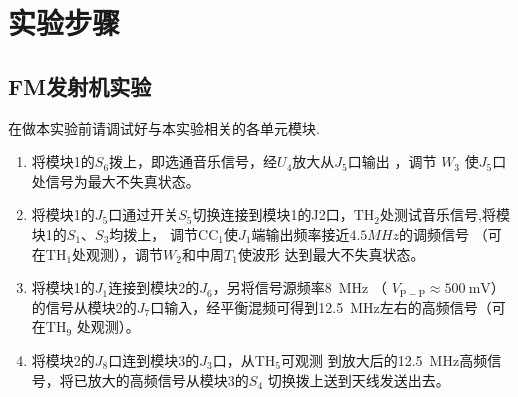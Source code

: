 \documentclass[../main]{subfiles}
\begin{document}
\section{实验步骤}%
\label{sec:\arabic{chapter}实验步骤}

\subsection{FM发射机实验}%
\label{sub:FM发射机实验}

在做本实验前请调试好与本实验相关的各单元模块.

\begin{enumerate}

	\item 将模块1的$ S_6 $拨上，即选通音乐信号，经$ U_4 $放大从$ J_5 $口输出
		，调节 $ W_3 $ 使$ J_5 $口处信号为最大不失真状态。

	\item 将模块1的$ J_5 $口通过开关$ S_5 $切换连接到模块1的J2口，$
		\mathrm{TH}_2 $处测试音乐信号,将模块1的$ S_1 $、$ S_3 $均拨上，
		调节$ \mathrm{CC}_1 $使$ J_1 $端输出频率接近$ 4.5MHz $的调频信号
		（可在$ \mathrm{TH}_1 $处观测），调节$ W_2 $和中周$ T_1 $使波形
		达到最大不失真状态。

	\item 将模块1的$ J_1 $连接到模块2的$ J_6 $，另将信号源频率\SI{8}{\MHz}
		（ $ V_\mathrm{P-P}\approx\SI{500}{\mV} $）的信号从模块2的$ J_7
		$口输入，经平衡混频可得到\SI{12.5}{\MHz}左右的高频信号（可在$
		\mathrm{TH}_9 $ 处观测）。

	\item 将模块2的$ J_8 $口连到模块3的$ J_3 $口，从$ \mathrm{TH}_5 $可观测
		到放大后的\SI{12.5}{\MHz}高频信号，将已放大的高频信号从模块3的$
		S_4 $ 切换拨上送到天线发送出去。

\end{enumerate}
\end{document}
